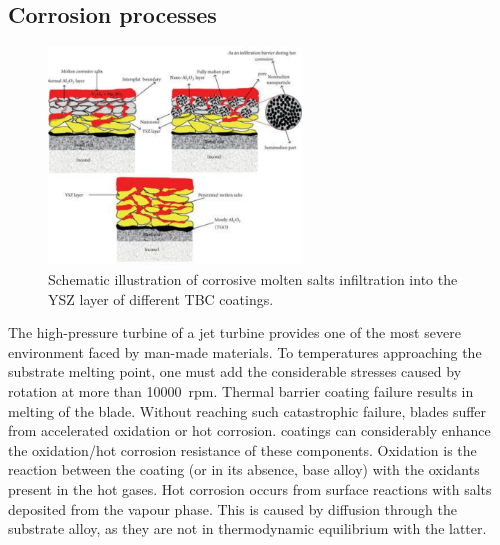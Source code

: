 \subsection{Corrosion processes}
\begin{figure}[H]
    \centering
    \includegraphics[width =0.6\textwidth]{img/figure31.png}
    \caption{Schematic illustration of corrosive molten salts infiltration into the YSZ layer of different TBC coatings.}
\end{figure}
The high-pressure turbine of a jet turbine provides one of the most severe environment faced by man-made materials. To temperatures approaching the substrate melting point, one must add the considerable stresses caused by rotation at more than \SI{10000}{rpm}. Thermal barrier coating failure results in melting of the blade. Without reaching such catastrophic failure, blades suffer from accelerated oxidation or hot corrosion. coatings can considerably enhance the oxidation/hot corrosion resistance of these components. Oxidation is the reaction between the coating (or in its absence, base alloy) with the oxidants present in the hot gases. Hot corrosion occurs from surface reactions with salts deposited from the vapour phase. This is caused by diffusion through the substrate alloy, as they are not in thermodynamic equilibrium with the latter.
